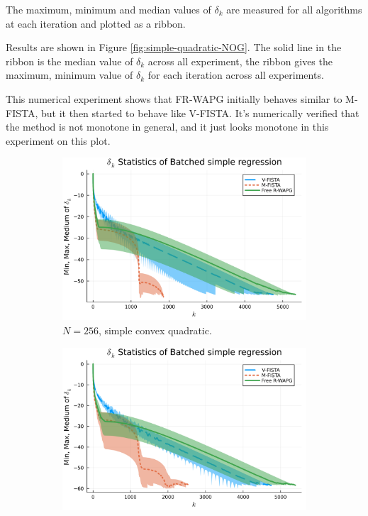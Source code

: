 \documentclass[12pt]{article}
\begin{document}
            The maximum, minimum and median values of $\delta_k$ are measured for all algorithms at each iteration and plotted as a ribbon.
            \par
            Results are shown in Figure \ref{fig:simple-quadratic-NOG}.
            The solid line in the ribbon is the median value of $\delta_k$ across all experiment, the ribbon gives the maximum, minimum value of $\delta_k$ for each iteration across all experiments.
            \par
            This numerical experiment shows that FR-WAPG initially behaves similar to M-FISTA, but it then started to behave like V-FISTA.
            It's numerically verified that the method is not monotone in general, and it just looks monotone in this experiment on this plot.
            \begin{figure}[H]
                \begin{subfigure}[b]{0.47\textwidth}
                    \centering
                    \includegraphics[width=\textwidth]{assets/simple_regression_batched-256.png}
                    \caption{$N = 256$, simple convex quadratic.}
                \end{subfigure}
                \hfill
                \begin{subfigure}[b]{0.47\textwidth}
                    \centering
                    \includegraphics[width=\textwidth]{assets/simple_regression_batched-1024.png}

\end{subfigure}
\end{figure}
\end{document}
